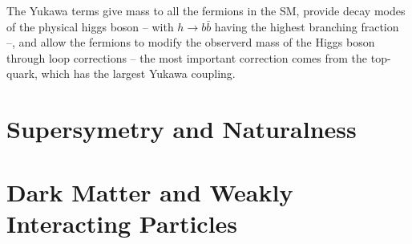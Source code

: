 The Yukawa terms give mass to all the fermions in the SM, provide decay modes of the physical higgs boson -- with
$h\rightarrow b\bar{b}$ having the highest branching fraction --, and
allow the fermions to modify the observerd mass of the Higgs boson through
loop corrections -- the most important correction comes from the
top-quark, which has the largest Yukawa coupling.
\chapter{Supersymetry and Naturalness}
\chapter{Dark Matter and Weakly Interacting Particles}


